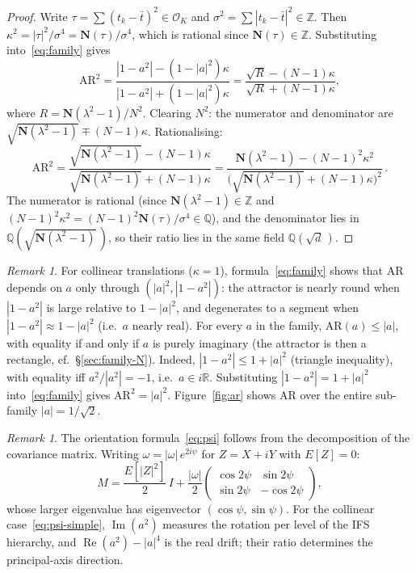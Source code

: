 \documentclass{amsart}
\theoremstyle{definition}
\theoremstyle{remark}
\newtheorem{remark}[theorem]{Remark}
\begin{document}
\begin{proof}
Write $\tau = \sum(t_k-\bar t)^2 \in \mathcal{O}_K$
and $\sigma^2 = \sum |t_k-\bar t|^2 \in \mathbb{Z}$.
Then $\kappa^2 = |\tau|^2/\sigma^4 = \mathbf{N}(\tau)/\sigma^4$,
which is rational since $\mathbf{N}(\tau)\in\mathbb{Z}$.
Substituting into~\eqref{eq:family} gives
\[
  \mathrm{AR}^2
  = \frac{|1-a^2| - (1-|a|^2)\kappa}{|1-a^2| + (1-|a|^2)\kappa}
  = \frac{\sqrt{R} - (N\!-\!1)\kappa}
         {\sqrt{R} + (N\!-\!1)\kappa},
\]
where $R = \mathbf{N}(\lambda^2-1)/N^2$.
Clearing $N^2$: the numerator and denominator are
$\sqrt{\mathbf{N}(\lambda^2-1)} \mp (N\!-\!1)\kappa$.
Rationalising:
\[
  \mathrm{AR}^2
  = \frac{\sqrt{\mathbf{N}(\lambda^2\!-\!1)} - (N\!-\!1)\kappa}
         {\sqrt{\mathbf{N}(\lambda^2\!-\!1)} + (N\!-\!1)\kappa}
  = \frac{\mathbf{N}(\lambda^2\!-\!1) - (N\!-\!1)^2\kappa^2}
         {\bigl(\sqrt{\mathbf{N}(\lambda^2\!-\!1)} + (N\!-\!1)\kappa\bigr)^2}\,.
\]
The numerator is rational
(since $\mathbf{N}(\lambda^2\!-\!1)\in\mathbb{Z}$
and $(N\!-\!1)^2\kappa^2 = (N\!-\!1)^2\mathbf{N}(\tau)/\sigma^4 \in\mathbb{Q}$),
and the denominator lies in $\mathbb{Q}(\sqrt{\mathbf{N}(\lambda^2-1)}\,)$,
so their ratio lies in the same field $\mathbb{Q}(\sqrt{d}\,)$.
\end{proof}

\begin{remark}
For collinear translations ($\kappa=1$),
formula~\eqref{eq:family} shows that $\mathrm{AR}$ depends on $a$ only
through $(|a|^2, |1-a^2|)$: the attractor is nearly round when $|1-a^2|$
is large relative to $1-|a|^2$, and degenerates to a segment when
$|1-a^2|\approx 1-|a|^2$ (i.e.\ $a$ nearly real).
For every $a$ in the family, $\mathrm{AR}(a) \leq |a|$, with equality
if and only if $a$ is purely imaginary
(the attractor is then a rectangle, cf.\ \S\ref{sec:family-N}).
Indeed, $|1-a^2| \leq 1+|a|^2$ (triangle inequality), with equality iff
$a^2/|a^2|=-1$, i.e.\ $a\in i\mathbb{R}$.
Substituting $|1-a^2|=1+|a|^2$ into~\eqref{eq:family} gives
$\mathrm{AR}^2 = |a|^2$.
Figure~\ref{fig:ar} shows $\mathrm{AR}$ over the entire sub-family $|a|=1/\sqrt{2}$.
\end{remark}

\begin{remark}\label{rem:orientation}
The orientation formula~\eqref{eq:psi} follows from the decomposition
of the covariance matrix.  Writing $\omega = |\omega|\, e^{2i\psi}$
for $Z = X + iY$ with $E[Z]=0$:
\[
  M = \frac{E[|Z|^2]}{2}\,I
    + \frac{|\omega|}{2}
      \begin{pmatrix}\cos 2\psi & \sin 2\psi \\ \sin 2\psi & -\cos 2\psi\end{pmatrix},
\]
whose larger eigenvalue has eigenvector $(\cos\psi, \sin\psi)$.
For the collinear case~\eqref{eq:psi-simple},
$\operatorname{Im}(a^2)$ measures the rotation per level of the
IFS hierarchy, and $\operatorname{Re}(a^2)-|a|^4$ is the real drift;
their ratio determines the principal-axis direction.
\end{remark}
\end{document}
